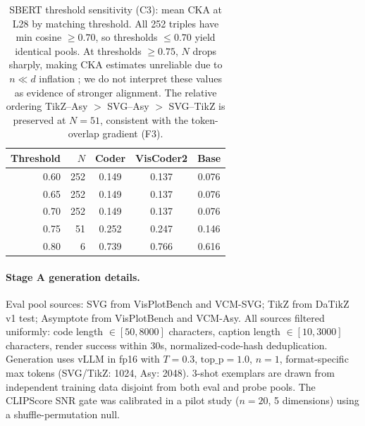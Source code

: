\begin{table}[h!]
\centering
\small
\caption{SBERT threshold sensitivity (C3): mean CKA at L28 by matching threshold. All 252 triples have min cosine $\geq 0.70$, so thresholds $\leq 0.70$ yield identical pools. At thresholds $\geq 0.75$, $N$ drops sharply, making CKA estimates unreliable due to $n \ll d$ inflation \cite{nguyen2021wide}; we do not interpret these values as evidence of stronger alignment. The relative ordering TikZ--Asy $>$ SVG--Asy $>$ SVG--TikZ is preserved at $N{=}51$, consistent with the token-overlap gradient (F3).}
\label{tab:sbert_sensitivity}
\begin{tabular}{rr ccc}
\toprule
Threshold & $N$ & Coder & VisCoder2 & Base \\
\midrule
0.60 & 252 & 0.149 & 0.137 & 0.076 \\
0.65 & 252 & 0.149 & 0.137 & 0.076 \\
0.70 & 252 & 0.149 & 0.137 & 0.076 \\
0.75 &  51 & 0.252 & 0.247 & 0.146 \\
0.80 &   6 & 0.739 & 0.766 & 0.616 \\
\bottomrule
\end{tabular}
\end{table}

\paragraph{Stage A generation details.}
Eval pool sources: SVG from VisPlotBench and VCM-SVG; TikZ from DaTikZ v1 test; Asymptote from VisPlotBench and VCM-Asy.
All sources filtered uniformly: code length $\in [50, 8000]$ characters, caption length $\in [10, 3000]$ characters, render success within 30s, normalized-code-hash deduplication.
Generation uses vLLM \cite{vllm} in fp16 with $T{=}0.3$, $\text{top\_p}{=}1.0$, $n{=}1$, format-specific max tokens (SVG/TikZ: 1024, Asy: 2048).
3-shot exemplars are drawn from independent training data disjoint from both eval and probe pools.
The CLIPScore SNR gate was calibrated in a pilot study ($n{=}20$, 5 dimensions) using a shuffle-permutation null.

